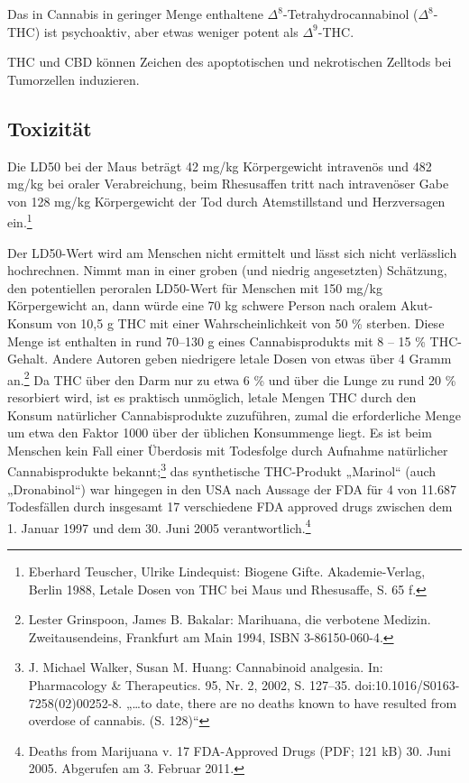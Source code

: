 \documentclass[openany]{scrbook}
\begin{document}
		Das in Cannabis in geringer Menge enthaltene $\Delta^8$-Tetrahydrocannabinol ($\Delta^8$-THC) ist psychoaktiv, aber etwas weniger potent als $\Delta^9$-THC.
		
		THC und CBD können Zeichen des apoptotischen und nekrotischen Zelltods bei Tumorzellen induzieren.
		

\subsection{Toxizität}
	Die LD50 bei der Maus beträgt 42 mg/kg Körpergewicht intravenös und 482 mg/kg bei oraler Verabreichung, beim Rhesusaffen tritt nach intravenöser Gabe von 128 mg/kg Körpergewicht der Tod durch Atemstillstand und Herzversagen ein.\footnote[7]{Eberhard Teuscher, Ulrike Lindequist: Biogene Gifte. Akademie-Verlag, Berlin 1988, Letale Dosen von THC bei Maus und Rhesusaffe, S. 65 f.}
	
	Der LD50-Wert wird am Menschen nicht ermittelt und lässt sich nicht verlässlich hochrechnen. Nimmt man in einer groben (und niedrig angesetzten) Schätzung, den potentiellen peroralen LD50-Wert für Menschen mit 150 mg/kg Körpergewicht an, dann würde eine 70 kg schwere Person nach oralem Akut-Konsum von 10,5 g THC mit einer Wahrscheinlichkeit von 50 \% sterben. Diese Menge ist enthalten in rund 70–130 g eines Cannabisprodukts mit 8 – 15 \% THC-Gehalt. Andere Autoren geben niedrigere letale Dosen von etwas über 4 Gramm an.\footnote[5]{ Lester Grinspoon, James B. Bakalar: Marihuana, die verbotene Medizin. Zweitausendeins, Frankfurt am Main 1994, ISBN 3-86150-060-4.} Da THC über den Darm nur zu etwa 6 \% und über die Lunge zu rund 20 \% resorbiert wird, ist es praktisch unmöglich, letale Mengen THC durch den Konsum natürlicher Cannabisprodukte zuzuführen, zumal die erforderliche Menge um etwa den Faktor 1000 über der üblichen Konsummenge liegt. Es ist beim Menschen kein Fall einer Überdosis mit Todesfolge durch Aufnahme natürlicher Cannabisprodukte bekannt;\footnote[8]{J. Michael Walker, Susan M. Huang: Cannabinoid analgesia. In: Pharmacology \& Therapeutics. 95, Nr. 2, 2002, S. 127–35. doi:10.1016/S0163-7258(02)00252-8. „…to date, there are no deaths known to have resulted from overdose of cannabis. (S. 128)“} das synthetische THC-Produkt „Marinol“ (auch „Dronabinol“) war hingegen in den USA nach Aussage der FDA für 4 von 11.687 Todesfällen durch insgesamt 17 verschiedene FDA approved drugs zwischen dem 1. Januar 1997 und dem 30. Juni 2005 verantwortlich.\footnote[9]{Deaths from Marijuana v. 17 FDA-Approved Drugs (PDF; 121 kB) 30. Juni 2005. Abgerufen am 3. Februar 2011.}	
	
\end{document}
